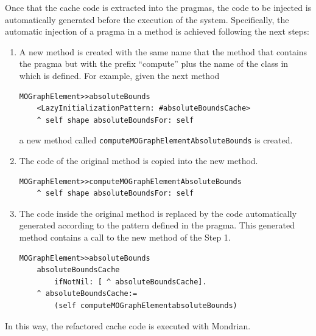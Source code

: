 \documentclass[preprint,10pt]{sigplanconf}
\newcommand{\ct}{\lstinline[backgroundcolor=\color{white},basicstyle=\footnotesize\ttfamily]}
\begin{document}
Once that the cache code is extracted into the pragmas, the code to
be injected is automatically generated before the execution of the
system. Specifically, the automatic injection of a pragma in a method
is achieved following the next steps: 
\begin{enumerate}
\item A new method is created with the same name that the method that contains
the pragma but with the prefix {}``compute'' plus the name of the
class in which is defined. For example, given the next method
\begin{lstlisting} 
MOGraphElement>>absoluteBounds
	<LazyInitializationPattern: #absoluteBoundsCache> 
	^ self shape absoluteBoundsFor: self
\end{lstlisting}
a new method called \ct{computeMOGraphElementAbsoluteBounds} is created.
\item The code of the original method is copied into the new method.
\begin{lstlisting} 
MOGraphElement>>computeMOGraphElementAbsoluteBounds
	^ self shape absoluteBoundsFor: self
\end{lstlisting}
\item The code inside the original method is replaced by the code automatically
generated according to the pattern defined in the pragma. This generated
method contains a call to the new method of the Step 1.
\begin{lstlisting} 
MOGraphElement>>absoluteBounds
	absoluteBoundsCache 
		ifNotNil: [ ^ absoluteBoundsCache].
	^ absoluteBoundsCache:=
		(self computeMOGraphElementabsoluteBounds)
\end{lstlisting}
\end{enumerate}
In this way, the refactored cache code is executed with Mondrian.
\end{document}
